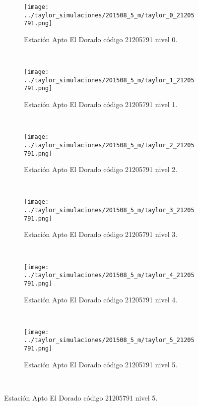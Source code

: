 \begin{figure}[H]\ContinuedFloat
\centering
\begin{subfigure}[normla]{0.4\textwidth}
\caption{Estación Apto El Dorado  código 21205791 nivel 0.}
\texttt{[image: ../taylor\_simulaciones/201508\_5\_m/taylor\_0\_21205791.png]}
\end{subfigure}
~
\begin{subfigure}[normla]{0.4\textwidth}
\caption{Estación Apto El Dorado  código 21205791 nivel 1.}
\texttt{[image: ../taylor\_simulaciones/201508\_5\_m/taylor\_1\_21205791.png]}
\end{subfigure}
~
\begin{subfigure}[normla]{0.4\textwidth}
\caption{Estación Apto El Dorado  código 21205791 nivel 2.}
\texttt{[image: ../taylor\_simulaciones/201508\_5\_m/taylor\_2\_21205791.png]}
\end{subfigure}
~
\begin{subfigure}[normla]{0.4\textwidth}
\caption{Estación Apto El Dorado  código 21205791 nivel 3.}
\texttt{[image: ../taylor\_simulaciones/201508\_5\_m/taylor\_3\_21205791.png]}
\end{subfigure}
~
\begin{subfigure}[normla]{0.4\textwidth}
\caption{Estación Apto El Dorado  código 21205791 nivel 4.}
\texttt{[image: ../taylor\_simulaciones/201508\_5\_m/taylor\_4\_21205791.png]}
\end{subfigure}
~
\begin{subfigure}[normla]{0.4\textwidth}
\caption{Estación Apto El Dorado  código 21205791 nivel 5.}
\texttt{[image: ../taylor\_simulaciones/201508\_5\_m/taylor\_5\_21205791.png]}
\end{subfigure}
~
\end{figure}
           
